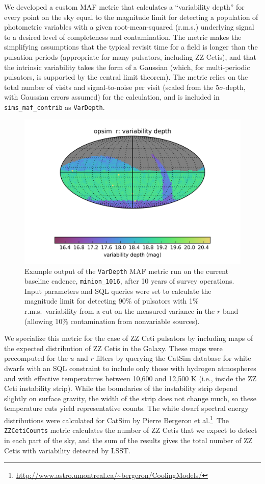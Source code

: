 We developed a custom MAF metric that calculates a ``variability depth'' for every point on the sky equal to the magnitude limit for detecting a population of photometric variables with a given root-mean-squared (r.m.s.) underlying signal to a desired level of completeness and contamination.  The metric makes the simplifying assumptions that the typical revisit time for a field is longer than the pulsation periods (appropriate for many pulsators, including ZZ Cetis), and that the intrinsic variability takes the form of a Gaussian (which, for multi-periodic pulsators, is supported by the central limit theorem).  The metric relies on the total number of visits and signal-to-noise per visit (scaled from the 5$\sigma$-depth, with Gaussian errors assumed) for the calculation, and is included in {\tt sims\_maf\_contrib} as {\tt VarDepth}.

\begin{figure}
  \centering
  \includegraphics[width=0.76\columnwidth]{figs/vardepth.png}
  \caption{Example output of the {\tt VarDepth} MAF metric run on the current baseline cadence, {\tt minion\_1016}, after 10 years of survey operations. Input parameters and SQL queries were set to calculate the magnitude limit for detecting 90\% of pulsators with 1\% r.m.s.\ variability from a cut on the measured variance in the $r$ band (allowing 10\% contamination from nonvariable sources).}
  \label{fig:vardepth}
\end{figure}


We specialize this metric for the case of ZZ Ceti pulsators by including maps of the expected distribution of ZZ Cetis in the Galaxy. These maps were precomputed for the $u$ and $r$ filters by querying the CatSim database for white dwarfs with an SQL constraint to include only those with hydrogen atmospheres and with effective temperatures between 10,600 and 12,500 K (i.e., inside the ZZ Ceti instability strip).  While the boundaries of the instability strip depend slightly on surface gravity, the width of the strip does not change much, so these temperature cuts yield representative counts.  The white dwarf spectral energy distributions were calculated for CatSim by Pierre Bergeron et al.\footnote{\url{http://www.astro.umontreal.ca/~bergeron/CoolingModels/}}\  The {\tt ZZCetiCounts} metric calculates the number of ZZ Cetis that we expect to detect in each part of the sky, and the sum of the results gives the total number of ZZ Cetis with variability detected by LSST.

